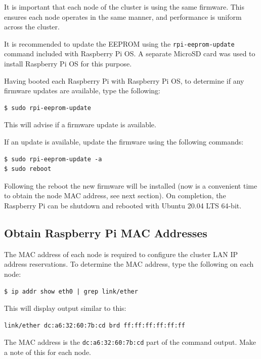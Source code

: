 \documentclass{report}
\begin{document}
It is important that each node of the cluster is using the same firmware. This ensures each node operates in the same manner, and performance is uniform across the cluster.

It is recommended to update the EEPROM using the \verb|rpi-eeprom-update| command included with Raspberry Pi OS. A separate MicroSD card was used to install Raspberry Pi OS for this purpose.

Having booted each Raspberry Pi with Raspberry Pi OS, to determine if any firmware updates are available, type the following:

\lstset{style=type}
\begin{lstlisting}[]
$ sudo rpi-eeprom-update
\end{lstlisting}

This will advise if a firmware update is available.

If an update is available, update the firmware using the following commands:

\lstset{style=type}
\begin{lstlisting}[]
$ sudo rpi-eeprom-update -a
$ sudo reboot
\end{lstlisting}

Following the reboot the new firmware will be installed (now is a convenient time to obtain the node MAC address, see next section). On completion, the Raspberry Pi can be shutdown and rebooted with Ubuntu 20.04 LTS 64-bit. 


%
%
\subsection{Obtain Raspberry Pi MAC Addresses}

The MAC address of each node is required to configure the cluster LAN IP address reservations. To determine the MAC address, type the following on each node:

\lstset{style=type}
\begin{lstlisting}[]
$ ip addr show eth0 | grep link/ether 
\end{lstlisting}

This will display output similar to this:

\lstset{style=term}
\begin{lstlisting}[]
link/ether dc:a6:32:60:7b:cd brd ff:ff:ff:ff:ff:ff
\end{lstlisting}

The MAC address is the \verb|dc:a6:32:60:7b:cd| part of the command output. Make a note of this for each node.
\end{document}
